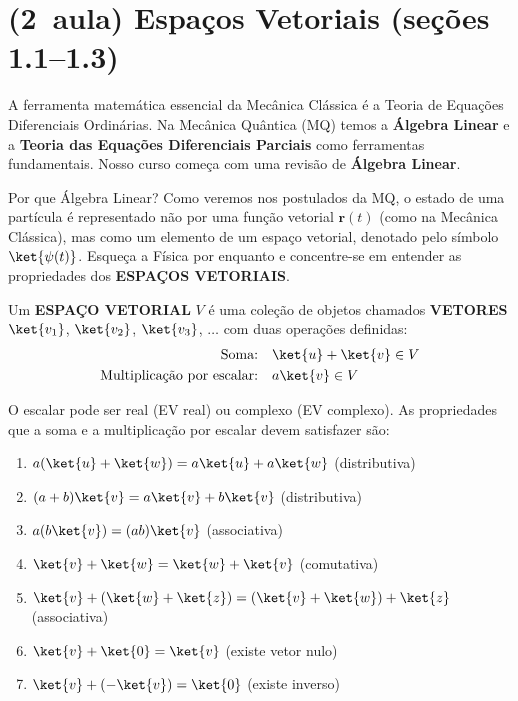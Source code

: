 \section*{(2\textordfeminine\ aula) Espaços Vetoriais (seções 1.1--1.3)}

A ferramenta matemática essencial da Mecânica Clássica é a Teoria de Equações Diferenciais Ordinárias.
Na Mecânica Quântica (MQ) temos a \textbf{Álgebra Linear} e a \textbf{Teoria das Equações Diferenciais Parciais} como ferramentas fundamentais. Nosso curso começa com uma revisão de \textbf{Álgebra Linear}.

Por que Álgebra Linear? Como veremos nos postulados da MQ, o estado de uma partícula é representado não por uma função vetorial ${\bm r}(t)$ (como na Mecânica Clássica), mas como um elemento de um espaço vetorial, denotado pelo símbolo $\ket{\psi(t)}$. Esqueça a Física por enquanto e concentre-se em entender as propriedades dos \textbf{ESPAÇOS VETORIAIS}.

\begin{shadequote}
    Um \textbf{ESPAÇO VETORIAL} $V$ é uma coleção de objetos chamados \textbf{VETORES} $\ket{v_1}$, $\ket{v_2}$, $\ket{v_3}$, $\dots$ com duas operações definidas:
    \begin{align}
        \text{Soma:} \quad & \ket{u} + \ket{v} \in V \\
        \text{Multiplicação por escalar:} \quad & a\ket{v} \in V
    \end{align}
\end{shadequote}

O escalar pode ser real (EV real) ou complexo (EV complexo). As propriedades que a soma e a multiplicação por escalar devem satisfazer são:
\begin{enumerate}
    \item $a(\ket{u} + \ket{w}) = a\ket{u} + a\ket{w}$ \quad (distributiva)
    \item $(a + b)\ket{v} = a\ket{v} + b\ket{v}$ \quad (distributiva)
    \item $a(b\ket{v}) = (ab)\ket{v}$ \quad (associativa)
    \item $\ket{v} + \ket{w} = \ket{w} + \ket{v}$ \quad (comutativa)
    \item $\ket{v} + (\ket{w} + \ket{z}) = (\ket{v} + \ket{w}) + \ket{z}$ \quad (associativa)
    \item $\ket{v} + \ket{0} = \ket{v}$ \quad (existe vetor nulo)
    \item $\ket{v} + (-\ket{v}) = \ket{0}$ \quad (existe inverso)
\end{enumerate}

